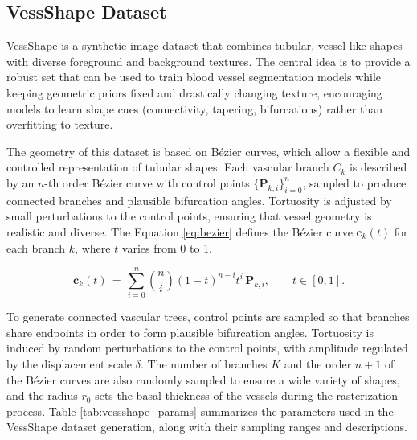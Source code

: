 \documentclass[%
reprint,
nofootinbib,
 amsmath,amssymb,
aps,
superscriptaddress,
showkeys,
longbibliography
]{revtex4-1}
\begin{document}
\subsection{VessShape Dataset}

VessShape is a synthetic image dataset that combines tubular, vessel-like shapes with diverse foreground and background textures. The central idea is to provide a robust set that can be used to train blood vessel segmentation models while keeping geometric priors fixed and drastically changing texture, encouraging models to learn shape cues (connectivity, tapering, bifurcations) rather than overfitting to texture.

The geometry of this dataset is based on Bézier curves, which allow a flexible and controlled representation of tubular shapes. Each vascular branch $C_k$ is described by an $n$-th order Bézier curve with control points $\{\mathbf{P}_{k,i}\}_{i=0}^n$, sampled to produce connected branches and plausible bifurcation angles. Tortuosity is adjusted by small perturbations to the control points, ensuring that vessel geometry is realistic and diverse. The Equation \ref{eq:bezier} defines the Bézier curve $\mathbf{c}_k(t)$ for each branch $k$, where $t$ varies from 0 to 1.

\begin{equation}
\mathbf{c}_k(t) \,=\, \sum_{i=0}^{n} \binom{n}{i} (1-t)^{n-i} t^{i} \, \mathbf{P}_{k,i}, \qquad t \in [0,1].
\label{eq:bezier}
\end{equation}

To generate connected vascular trees, control points are sampled so that branches share endpoints in order to form plausible bifurcation angles. Tortuosity is induced by random perturbations to the control points, with amplitude regulated by the displacement scale $\delta$. The number of branches $K$ and the order $n+1$ of the Bézier curves are also randomly sampled to ensure a wide variety of shapes, and the radius $r_0$ sets the basal thickness of the vessels during the rasterization process. Table \ref{tab:vessshape_params} summarizes the parameters used in the VessShape dataset generation, along with their sampling ranges and descriptions.
\end{document}
